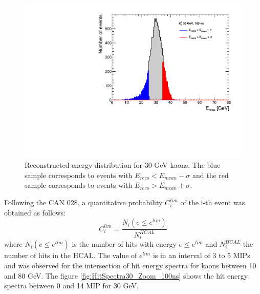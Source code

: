 \begin{figure}[htbp!]
  \centering
  \includegraphics[width=0.6\linewidth]{../Thesis_Plots/ILD/AdditionalPlots/Plots/EnergySum_100ns_30GeV.pdf}
  \caption{Reconstructed energy distribution for 30 GeV kaons. The blue sample corresponds to events with $E_{reco} < E_{mean} - \sigma$ and the red sample corresponds to events with $E_{reco} > E_{mean} + \sigma$.} \label{fig:Esum30_100ns}
\end{figure}

Following the CAN 028, a quantitative probability $C_{i}^{lim}$ of the i-th event was obtained as follows:
\begin{equation}
  C_{i}^{lim} = \frac{N_{i}(e \leq e^{lim})}{N_{i}^{HCAL}}
\end{equation}
where $N_{i}(e \leq e^{lim})$ is the number of hits with energy $e \leq e^{lim}$ and $N_{i}^{HCAL}$ the number of hits in the HCAL. The value of $e^{lim}$ is in an interval of 3 to 5 MIPs and was observed for the intersection of hit energy spectra for kaons between 10 and 80 GeV. The figure \ref{fig:HitSpectra30_Zoom_100ns} shows the hit energy spectra between 0 and 14 MIP for 30 GeV.

